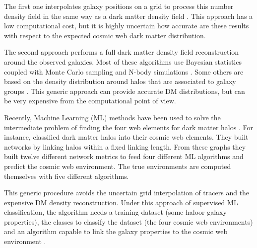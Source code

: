 \documentclass[usenatbib]{mnras}
\begin{document}
The first one interpolates galaxy positions on a grid to process
this number density field in the same way as a dark matter density
field \citep{Eardley2015,Alpaslan2016,Tojeiro2017,Shadab2019}.
This approach has a low computational cost, but it is highly uncertain
how accurate are these results with respect to the expected  cosmic
web dark matter distribution. 

The second approach performs a full dark matter density field
reconstruction around the observed galaxies.
Most of these algorithms use Bayesian statistics coupled with Monte
Carlo sampling  and N-body
simulations \citep{Jasche2010,Jasche2013a,Bos2014,LeclercqJasche2015,Horowitz2019,Burchett2020}. 
Some others are based on the density distribution around halos that
are associated to galaxy groups \citep{Wang2009,2011MNRAS.417.1303M}.  
This generic approach can provide accurate DM distributions, but can
be very expensive from the computational point of view. 

Recently, Machine Learning (ML) methods have been used to solve the
intermediate problem of finding the four web elements for dark matter
halos \citep{Hui2018,2020MNRAS.495.1311T}.
For instance, \cite{2020MNRAS.495.1311T} classified
dark  matter halos into their cosmic web elements. 
They built networks by linking halos within a fixed linking length.
From these graphs they built twelve different network metrics to feed
four different ML algorithms and predict the cosmic web
environment. 
The true environments are computed themselves with five different
algorithms.  

This generic procedure avoids the uncertain grid interpolation of
tracers and the expensive DM density reconstruction. 
Under this approach of supervised ML classification, 
the algorithm needs a training dataset (some haloor galaxy
properties), the classes to classify the dataset (the four cosmic web
environments) and an algorithm capable to link the galaxy properties
to the cosmic web environment . 
\end{document}
